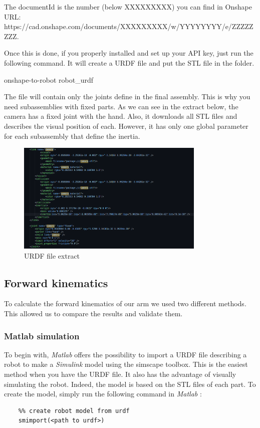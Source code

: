 The documentId is the number (below XXXXXXXXX) you can find in Onshape URL:
\\https://cad.onshape.com/documents/XXXXXXXXX/w/YYYYYYYY/e/ZZZZZZZZ.

\bigbreak
Once this is done, if you properly installed and set up your API key, just run the following command. It will create a URDF file and put the STL file in the folder.
\begin{commandshell}
    onshape-to-robot robot_urdf
\end{commandshell} 

\bigbreak
The file will contain only the joints define in the final assembly. This is why you need subassemblies with fixed parts. As we can see in the extract below, the camera has a fixed joint with the hand. Also, it downloads all STL files and describes the visual position of each. However, it has only one global parameter for each subassembly that define the inertia.

\begin{figure}[ht]
    \centering
    \includegraphics[width=0.8\textwidth]{Images/Section05/urdf.png}
    \caption{URDF file extract}
    \label{fig:URDFextract}
\end{figure}
\FloatBarrier

\subsection{Forward kinematics}

To calculate the forward kinematics of our arm we used two different methods. This allowed us to compare the results and validate them. 

\subsubsection{Matlab simulation}

To begin with, \textit{Matlab} offers the possibility to import a URDF file describing a robot to make a \textit{Simulink} model using the simscape toolbox. This is the easiest method when you have the URDF file. It also has the advantage of visually simulating the robot. Indeed, the model is based on the STL files of each part. To create the model, simply run the following command in \textit{Matlab} : 
\begin{verbatim}
    %% create robot model from urdf
    smimport(<path to urdf>)
\end{verbatim}

